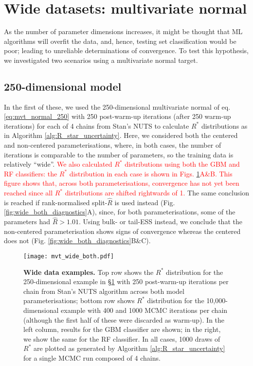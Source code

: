 \documentclass{article}
\begin{document}
\color{black}



\section{Wide datasets: multivariate normal}\label{sec:wide}
As the number of parameter dimensions increases, it might be thought that ML algorithms will overfit the data, and, hence, testing set classification would be poor; leading to unreliable determinations of convergence. To test this hypothesis, we investigated two scenarios using a multivariate normal target.

\subsection{250-dimensional model}
In the first of these, we used the 250-dimensional multivariate normal of eq. \eqref{eq:mvt_normal_250} with 250 post-warm-up iterations (after 250 warm-up iterations) for each of 4 chains from Stan's NUTS to calculate $R^*$ distributions as in Algorithm \ref{alg:R_star_uncertainty}. Here, we considered both the centered and non-centered parameterisations, where, in both cases, the number of iterations is comparable to the number of parameters, so the training data is relatively ``wide''. \textcolor{red}{We also calculated $R^*$ distributions using both the GBM and RF classifiers: the $R^*$ distribution in each case is shown in Figs. \ref{fig:mvt_wide_both}A\&B. This figure shows that, across both parameterisations, convergence has not yet been reached since all $R^*$ distributions are shifted rightwards of 1.} The same conclusion is reached if rank-normalised split-$\widehat{R}$ is used instead (Fig. \ref{fig:wide_both_diagnostics}A), since, for both parameterisations, some of the parameters had $\widehat{R}>1.01$. Using bulk- or tail-ESS instead, we conclude that the non-centered parameterisation shows signs of convergence whereas the centered does not (Fig. \ref{fig:wide_both_diagnostics}B\&C). 

\begin{figure}[!htb]
	\centerline{\texttt{[image: mvt\_wide\_both.pdf]}}
	\caption{\textbf{Wide data examples.} Top row shows the $R^*$ distribution for the 250-dimensional example in \S\ref{sec:wide} with 250 post-warm-up iterations per chain from Stan's NUTS algorithm across both model parameterisations; bottom row shows $R^*$ distribution for the 10,000-dimensional example with 400 and 1000 MCMC iterations per chain (although the first half of these were discarded as warm-up). In the left column, results for the GBM classifier are shown; in the right, we show the same for the RF classifier. In all cases, 1000 draws of $R^*$ are plotted as generated by Algorithm \ref{alg:R_star_uncertainty} for a single MCMC run composed of 4 chains.}
	\label{fig:mvt_wide_both}
\end{figure}
\end{document}
